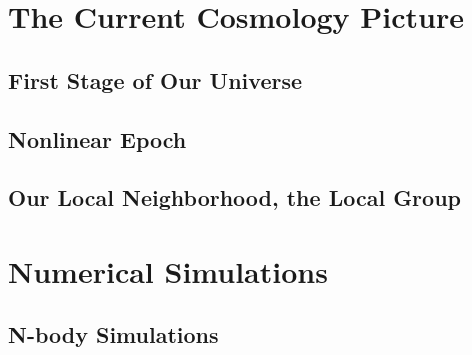 \section{The Current Cosmology Picture}
\label{sec:TheCurrentCosmologyPicture}


	\subsection{First Stage of Our Universe}
	\label{subsec:FirstStageOfOurUniverse}


	\subsection{Nonlinear Epoch}
	\label{subsec:NonlinearEpoch}


	\subsection{Our Local Neighborhood, the Local Group}
	\label{subsec:OurLocalNeighborhood}


\section{Numerical Simulations}
\label{sec:NumericalSimulations}


	\subsection{N-body Simulations}
	\label{subsec:N-bodySimulations}
	
